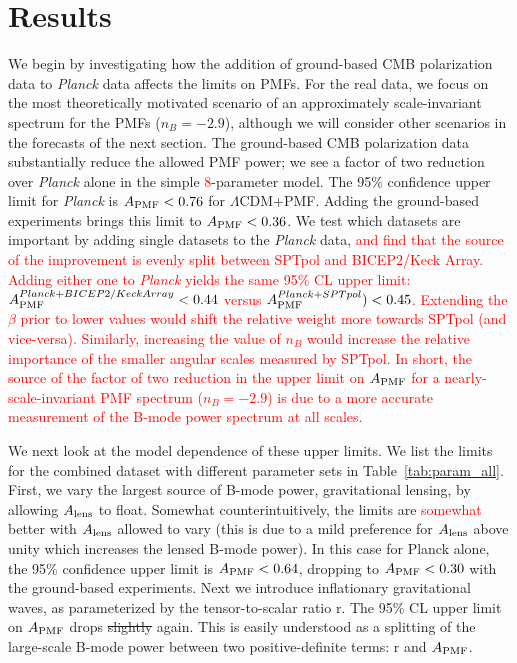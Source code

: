 \documentclass[apj]{emulateapj}
\newcommand{\apmf}{\ensuremath{A_{\rm PMF}}}
\newcommand{\alens}{\ensuremath{A_{\rm lens}}}
\newcommand{\lcdm}{\ensuremath{\Lambda}CDM}
\newcommand{\planck}{{\sl Planck}}
\newcommand{\bicepkeck}{BICEP2/Keck Array}
\newcommand{\sptpol}{SPTpol}
\newcommand{\changed}[1]{\textcolor{Red}{#1}}
\begin{document}
\section{Results}
\label{sec:results}

We begin by investigating how the addition of ground-based CMB polarization data to \planck{} data affects the limits on PMFs. 
For the real data, we focus on the most theoretically motivated scenario of an approximately scale-invariant spectrum for the PMFs ($n_B=-2.9$), although we will consider other scenarios in the forecasts of the next section. 
The ground-based CMB polarization data  substantially reduce the allowed PMF power; we see a factor of two reduction over \planck{} alone in the simple \changed{8}-parameter model. 
The 95\% confidence upper limit for \planck{} is $\apmf <  \upperAplk$ for \lcdm{}+PMF. 
Adding the ground-based experiments brings this limit to $\apmf <  \upperAall$. 
We test which datasets are important by adding single datasets to the \planck{} data, \changed{and find that the source of the improvement is evenly split between \sptpol{} and \bicepkeck{}. 
Adding either one to \planck{} yields the same 95\% CL upper limit: $\apmf^{\planck+\bicepkeck} <  \upperAbicep$ versus  $\apmf^{\planck+\sptpol}) < \upperAsptpol$. 
Extending the $\beta$ prior to lower values would shift the relative weight more towards \sptpol{} (and vice-versa). 
Similarly, increasing the value of $n_B$ would  increase the relative importance of the smaller angular scales measured by \sptpol.
In short, the source of the factor of two reduction in the upper limit on \apmf{} for a nearly-scale-invariant PMF spectrum ($n_B=-2.9$) is due to a more accurate measurement of the B-mode power spectrum at all scales. }


We next look at the model dependence of these upper limits. 
We list the limits for the combined dataset  with different parameter sets in Table~\ref{tab:param_all}. 
First, we vary the largest source of  B-mode power, gravitational lensing, by allowing \alens{} to float. 
Somewhat counterintuitively, the limits are \changed{somewhat} better with \alens{} allowed to vary (this is due to a mild preference for \alens{} above unity which increases the lensed B-mode power). 
In this case for  Planck alone, the 95\% confidence upper limit is $\apmf <  \upperAplkalens$, dropping to $\apmf <  \upperAallalens$ with the ground-based experiments. 
Next we introduce inflationary gravitational waves, as parameterized by the tensor-to-scalar ratio r. 
The 95\% CL upper limit on \apmf{} drops \st{slightly} again.  
This is easily understood as a splitting of the large-scale B-mode power between two positive-definite terms: r and \apmf{}. 
\end{document}
